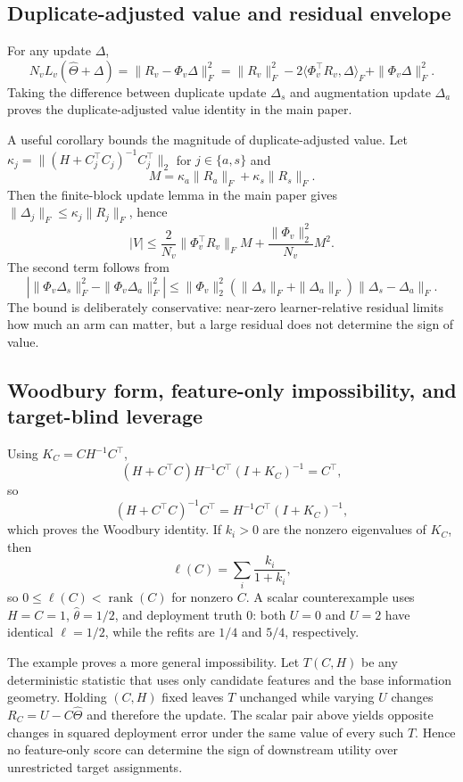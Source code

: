 \subsection{Duplicate-adjusted value and residual envelope}
For any update $\Delta$,
\[
N_vL_v(\widehat\Theta+\Delta)=\|R_v-\Phi_v\Delta\|_F^2
=\|R_v\|_F^2-2\langle\Phi_v^\top R_v,\Delta\rangle_F+\|\Phi_v\Delta\|_F^2.
\]
Taking the difference between duplicate update $\Delta_s$ and augmentation update $\Delta_a$ proves the duplicate-adjusted value identity in the main paper.

A useful corollary bounds the magnitude of duplicate-adjusted value. Let $\kappa_j=\|(H+C_j^\top C_j)^{-1}C_j^\top\|_2$ for $j\in\{a,s\}$ and
\[
M=\kappa_a\|R_a\|_F+\kappa_s\|R_s\|_F.
\]
Then the finite-block update lemma in the main paper gives $\|\Delta_j\|_F\le\kappa_j\|R_j\|_F$, hence
\[
|V|\le \frac{2}{N_v}\|\Phi_v^\top R_v\|_F M
+\frac{\|\Phi_v\|_2^2}{N_v}M^2.
\]
The second term follows from
\[
\left|\|\Phi_v\Delta_s\|_F^2-\|\Phi_v\Delta_a\|_F^2\right|
\le \|\Phi_v\|_2^2(\|\Delta_s\|_F+\|\Delta_a\|_F)\|\Delta_s-\Delta_a\|_F.
\]
The bound is deliberately conservative: near-zero learner-relative residual limits how much an arm can matter, but a large residual does not determine the sign of value.

\subsection{Woodbury form, feature-only impossibility, and target-blind leverage}\label{app:feature-proxy}
Using $K_C=CH^{-1}C^\top$,
\[
(H+C^\top C)H^{-1}C^\top(I+K_C)^{-1}=C^\top,
\]
so
\[
(H+C^\top C)^{-1}C^\top=H^{-1}C^\top(I+K_C)^{-1},
\]
which proves the Woodbury identity. If $k_i>0$ are the nonzero eigenvalues of $K_C$, then
\[
\ell(C)=\sum_i\frac{k_i}{1+k_i},
\]
so $0\le \ell(C)<\operatorname{rank}(C)$ for nonzero $C$. A scalar counterexample uses $H=C=1$, $\widehat\theta=1/2$, and deployment truth $0$: both $U=0$ and $U=2$ have identical $\ell=1/2$, while the refits are $1/4$ and $5/4$, respectively.


The example proves a more general impossibility. Let $T(C,H)$ be any deterministic statistic that uses only candidate features and the base information geometry. Holding $(C,H)$ fixed leaves $T$ unchanged while varying $U$ changes $R_C=U-C\widehat\Theta$ and therefore the update. The scalar pair above yields opposite changes in squared deployment error under the same value of every such $T$. Hence no feature-only score can determine the sign of downstream utility over unrestricted target assignments.

